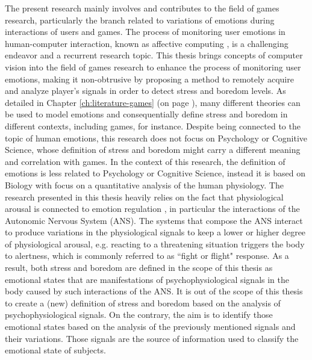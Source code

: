 The present research mainly involves and contributes to the field of games research, particularly the branch related to variations of emotions during interactions of users and games. The process of monitoring user emotions in human-computer interaction, known as affective computing \parencite{picard2000affective}, is a challenging endeavor and a recurrent research topic. This thesis brings concepts of computer vision into the field of games research to enhance the process of monitoring user emotions, making it non-obtrusive by proposing a method to remotely acquire and analyze player's signals in order to detect stress and boredom levels. As detailed in Chapter \ref{ch:literature-games} (on page \pageref{ch:literature-games}), many different theories can be used to model emotions and consequentially define stress and boredom in different contexts, including games, for instance. Despite being connected to the topic of human emotions, this research does not focus on Psychology or Cognitive Science, whose definition of stress and boredom might carry a different meaning and correlation with games. In the context of this research, the definition of emotions is less related to Psychology or Cognitive Science, instead it is based on Biology with focus on a quantitative analysis of the human physiology. The research presented in this thesis heavily relies on the fact that physiological arousal is connected to emotion regulation \parencite{appelhans2006heart,schubert2009effects}, in particular the interactions of the Autonomic Nervous System (ANS). The systems that compose the ANS interact to produce variations in the physiological signals to keep a lower or higher degree of physiological arousal, e.g. reacting to a threatening situation triggers the body to alertness, which is commonly referred to as ``fight or flight" response. As a result, both stress and boredom are defined in the scope of this thesis as emotional states that are manifestations of psychophysiological signals in the body caused by such interactions of the ANS. It is out of the scope of this thesis to create a (new) definition of stress and boredom based on the analysis of psychophysiological signals. On the contrary, the aim is to identify those emotional states based on the analysis of the previously mentioned signals and their variations. Those signals are the source of information used to classify the emotional state of subjects.

